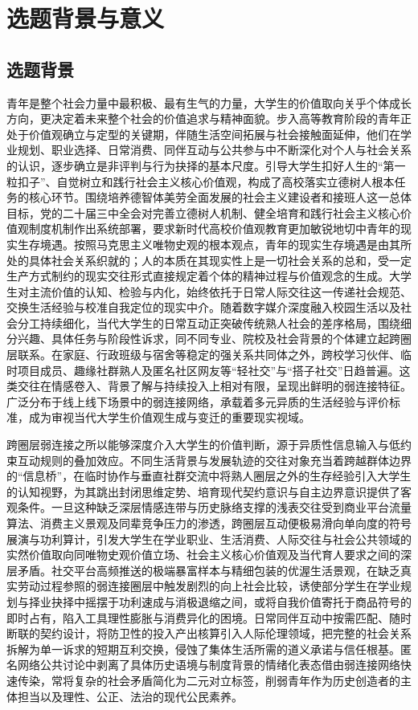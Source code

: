 \section{选题背景与意义}

\subsection{选题背景}

青年是整个社会力量中最积极、最有生气的力量\cite{Mao1991}，大学生的价值取向关乎个体成长方向，更决定着未来整个社会的价值追求与精神面貌\cite{Xi2014}。步入高等教育阶段的青年正处于价值观确立与定型的关键期，伴随生活空间拓展与社会接触面延伸，他们在学业规划、职业选择、日常消费、同伴互动与公共参与中不断深化对个人与社会关系的认识，逐步确立是非评判与行为抉择的基本尺度\cite{CPCC2017_Plan}。引导大学生扣好人生的“第一粒扣子”、自觉树立和践行社会主义核心价值观，构成了高校落实立德树人根本任务的核心环节\cite{CPCC2017_Ipe}。围绕培养德智体美劳全面发展的社会主义建设者和接班人这一总体目标\cite{Xi2018_Speech}，党的二十届三中全会对完善立德树人机制、健全培育和践行社会主义核心价值观制度机制作出系统部署\cite{CPCC2024_Jueding}，要求新时代高校价值观教育更加敏锐地切中青年的现实生存境遇。按照马克思主义唯物史观的根本观点，青年的现实生存境遇是由其所处的具体社会关系织就的；人的本质在其现实性上是一切社会关系的总和，受一定生产方式制约的现实交往形式直接规定着个体的精神过程与价值观念的生成\cite{MarxEngels2009}。大学生对主流价值的认知、检验与内化，始终依托于日常人际交往这一传递社会规范、交换生活经验与校准自我定位的现实中介。随着数字媒介深度融入校园生活以及社会分工持续细化，当代大学生的日常互动正突破传统熟人社会的差序格局，围绕细分兴趣、具体任务与阶段性诉求，同不同专业、院校及社会背景的个体建立起跨圈层联系。在家庭、行政班级与宿舍等稳定的强关系共同体之外，跨校学习伙伴、临时项目成员、趣缘社群熟人及匿名社区网友等“轻社交”与“搭子社交”日趋普遍。这类交往在情感卷入、背景了解与持续投入上相对有限，呈现出鲜明的弱连接特征。广泛分布于线上线下场景中的弱连接网络，承载着多元异质的生活经验与评价标准，成为审视当代大学生价值观生成与变迁的重要现实视域。

跨圈层弱连接之所以能够深度介入大学生的价值判断，源于异质性信息输入与低约束互动规则的叠加效应。不同生活背景与发展轨迹的交往对象充当着跨越群体边界的“信息桥”，在临时协作与垂直社群交流中将熟人圈层之外的生存经验引入大学生的认知视野，为其跳出封闭思维定势、培育现代契约意识与自主边界意识提供了客观条件。一旦这种缺乏深层情感连带与历史脉络支撑的浅表交往受到商业平台流量算法、消费主义景观及同辈竞争压力的渗透，跨圈层互动便极易滑向单向度的符号展演与功利算计，引发大学生在学业职业、生活消费、人际交往与社会公共领域的实然价值取向同唯物史观价值立场、社会主义核心价值观及当代育人要求之间的深层矛盾。社交平台高频推送的极端暴富样本与精细包装的优渥生活景观，在缺乏真实劳动过程参照的弱连接圈层中触发剧烈的向上社会比较，诱使部分学生在学业规划与择业抉择中摇摆于功利速成与消极退缩之间，或将自我价值寄托于商品符号的即时占有，陷入工具理性膨胀与消费异化的困境。日常同伴互动中按需匹配、随时断联的契约设计，将防卫性的投入产出核算引入人际伦理领域，把完整的社会关系拆解为单一诉求的短期互利交换，侵蚀了集体生活所需的道义承诺与信任根基。匿名网络公共讨论中剥离了具体历史语境与制度背景的情绪化表态借由弱连接网络快速传染，常将复杂的社会矛盾简化为二元对立标签，削弱青年作为历史创造者的主体担当以及理性、公正、法治的现代公民素养。

